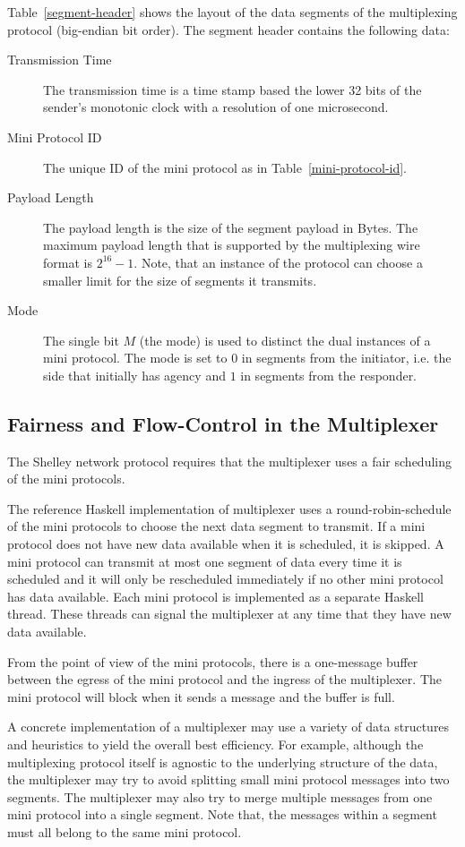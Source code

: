 Table~\ref{segment-header} shows the layout of the data segments of the multiplexing protocol
(big-endian bit order).
The segment header contains the following data:
\begin{description}
\item[Transmission Time]
  The transmission time is a time stamp based the lower 32 bits of the sender's monotonic clock with a
  resolution of one microsecond.
\item[Mini Protocol ID] The unique ID of the mini protocol as in Table~\ref{mini-protocol-id}.
\item[Payload Length] The payload length is the size of the segment payload in Bytes.
  The maximum payload length that is supported by the multiplexing wire format is $2^{16}-1$.
  Note, that an instance of the protocol can choose a smaller limit for the size of segments it transmits.
\item[Mode] The single bit $M$ (the mode) is used to distinct the dual instances of a mini protocol.
  The mode is set to $0$ in segments from the initiator, i.e. the side that initially has agency and
  $1$ in segments from the responder.
\end{description}

\subsection{Fairness and Flow-Control in the Multiplexer}
The Shelley network protocol requires that the multiplexer uses a fair scheduling of the mini protocols.

The reference Haskell implementation of multiplexer uses a round-robin-schedule of the mini protocols
to choose the next data segment to transmit.
If a mini protocol does not have new data available when it is scheduled, it is skipped.
A mini protocol can transmit at most one segment of data every time it is scheduled
and it will only be rescheduled immediately if no other mini protocol has data available.
Each mini protocol is implemented as a separate Haskell thread.
These threads can signal the multiplexer at any time that they have new data available.

From the point of view of the mini protocols, there is a one-message buffer between the egress of
the mini protocol and the ingress of the multiplexer.
The mini protocol will block when it sends a message and the buffer is full.

A concrete implementation of a multiplexer may use a variety of data structures and heuristics to
yield the overall best efficiency.
For example, although the multiplexing protocol itself is agnostic to the underlying structure of
the data, the multiplexer may try to avoid splitting small mini protocol messages into two segments.
The multiplexer may also try to merge multiple messages from one mini protocol into a
single segment.
Note that, the messages within a segment must all belong to the same mini protocol.

